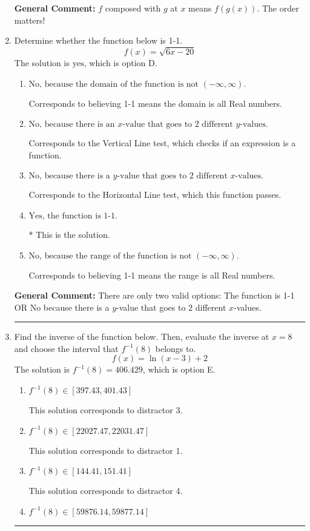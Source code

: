 \documentclass{extbook}[14pt]
\newcommand{\litem}[1]{\item #1

\rule{\textwidth}{0.4pt}}
\begin{document}
\begin{enumerate}
{\begin{enumerate}[label=\Alph*.]
\end{enumerate}

\textbf{General Comment:} $f$ composed with $g$ at $x$ means $f(g(x))$. The order matters!
}
\litem{
Determine whether the function below is 1-1.
\[ f(x) = \sqrt{6 x - 20} \]The solution is \( \text{yes} \), which is option D.\begin{enumerate}[label=\Alph*.]
\item \( \text{No, because the domain of the function is not $(-\infty, \infty)$.} \)

Corresponds to believing 1-1 means the domain is all Real numbers.
\item \( \text{No, because there is an $x$-value that goes to 2 different $y$-values.} \)

Corresponds to the Vertical Line test, which checks if an expression is a function.
\item \( \text{No, because there is a $y$-value that goes to 2 different $x$-values.} \)

Corresponds to the Horizontal Line test, which this function passes.
\item \( \text{Yes, the function is 1-1.} \)

* This is the solution.
\item \( \text{No, because the range of the function is not $(-\infty, \infty)$.} \)

Corresponds to believing 1-1 means the range is all Real numbers.
\end{enumerate}

\textbf{General Comment:} There are only two valid options: The function is 1-1 OR No because there is a $y$-value that goes to 2 different $x$-values.
}
\litem{
Find the inverse of the function below. Then, evaluate the inverse at $x = 8$ and choose the interval that $f^{-1}(8)$ belongs to.
\[ f(x) = \ln{(x-3)}+2 \]The solution is \( f^{-1}(8) = 406.429 \), which is option E.\begin{enumerate}[label=\Alph*.]
\item \( f^{-1}(8) \in [397.43, 401.43] \)

 This solution corresponds to distractor 3.
\item \( f^{-1}(8) \in [22027.47, 22031.47] \)

 This solution corresponds to distractor 1.
\item \( f^{-1}(8) \in [144.41, 151.41] \)

 This solution corresponds to distractor 4.
\item \( f^{-1}(8) \in [59876.14, 59877.14] \)


\end{enumerate}}
\end{enumerate}
\end{document}
